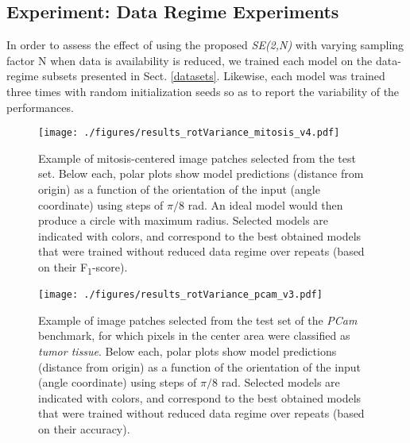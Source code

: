 \documentclass[twocolumn,final]{article}
\newcommand{\fscore}[1]{F\textsubscript{#1}-score}
\newcommand{\se}[1]{\textit{SE(#1)}}
\begin{document}
\subsection{Experiment: Data Regime Experiments}
\label{expDataRegime}
In order to assess the effect of using the proposed \se{2,N} with varying sampling factor N when data is availability is reduced, we trained each model on the data-regime subsets presented in Sect. \ref{datasets}.
Likewise, each model was trained three times with random initialization seeds so as to report the variability of the performances.

\begin{figure*}[ht!]
\begin{center}
\texttt{[image: ./figures/results\_rotVariance\_mitosis\_v4.pdf]}
\caption{
\footnotesize
Example of mitosis-centered image patches selected from the test set.
Below each, polar plots show model predictions (distance from origin) as a function of the orientation of the input (angle coordinate) using steps of $\pi / 8$ rad.
An ideal model would then produce a circle with maximum radius.
Selected models are indicated with colors, and correspond to the best obtained models that were trained without reduced data regime over repeats (based on their \fscore{1}).
}
\label{fig:resultsQualitativeMitosis}
\end{center}
\end{figure*}


\begin{figure*}[ht!]
\begin{center}
\texttt{[image: ./figures/results\_rotVariance\_pcam\_v3.pdf]}
\caption{
\footnotesize
Example of image patches selected from the test set of the \textit{PCam} benchmark, for which pixels in the center area were classified as \textit{tumor tissue}.
Below each, polar plots show model predictions (distance from origin) as a function of the orientation of the input (angle coordinate) using steps of $\pi / 8$ rad.
Selected models are indicated with colors, and correspond to the best obtained models that were trained without reduced data regime over repeats (based on their accuracy).
}
\label{fig:resultsQualitativePCam}
\end{center}
\end{figure*}
\end{document}
